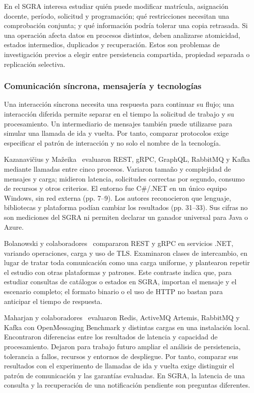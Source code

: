 En el SGRA interesa estudiar quién puede modificar matrícula, asignación docente, período, solicitud y programación; qué restricciones necesitan una comprobación conjunta; y qué información podría tolerar una copia retrasada. Si una operación afecta datos en procesos distintos, deben analizarse atomicidad, estados intermedios, duplicados y recuperación. Estos son problemas de investigación previos a elegir entre persistencia compartida, propiedad separada o replicación selectiva.

\subsubsection{Comunicación síncrona, mensajería y tecnologías}
Una interacción síncrona necesita una respuesta para continuar su flujo; una interacción diferida permite separar en el tiempo la solicitud de trabajo y su procesamiento. Un intermediario de mensajes también puede utilizarse para simular una llamada de ida y vuelta. Por tanto, comparar protocolos exige especificar el patrón de interacción y no solo el nombre de la tecnología.

Kazanavičius y Mažeika~\cite{kazanavicius2023-communication} evaluaron REST, gRPC, GraphQL, RabbitMQ y Kafka mediante llamadas entre cinco procesos. Variaron tamaño y complejidad de mensajes y carga; midieron latencia, solicitudes correctas por segundo, consumo de recursos y otros criterios. El entorno fue C\#/.NET en un único equipo Windows, sin red externa (pp. 7--9). Los autores reconocieron que lenguaje, bibliotecas y plataforma podían cambiar los resultados (pp. 31--33). Sus cifras no son mediciones del SGRA ni permiten declarar un ganador universal para Java o Azure.

Bolanowski y colaboradores~\cite{bolanowski2022-rest-grpc} compararon REST y gRPC en servicios .NET, variando operaciones, carga y uso de TLS. Examinaron clases de intercambio, en lugar de tratar toda comunicación como una carga uniforme, y plantearon repetir el estudio con otras plataformas y patrones. Este contraste indica que, para estudiar consultas de catálogos o estados en SGRA, importan el mensaje y el escenario completo; el formato binario o el uso de HTTP no bastan para anticipar el tiempo de respuesta.

Maharjan y colaboradores~\cite{maharjan2023-queues} evaluaron Redis, ActiveMQ Artemis, RabbitMQ y Kafka con OpenMessaging Benchmark y distintas cargas en una instalación local. Encontraron diferencias entre los resultados de latencia y capacidad de procesamiento. Dejaron para trabajo futuro ampliar el análisis de persistencia, tolerancia a fallos, recursos y entornos de despliegue. Por tanto, comparar sus resultados con el experimento de llamadas de ida y vuelta exige distinguir el patrón de comunicación y las garantías evaluadas. En SGRA, la latencia de una consulta y la recuperación de una notificación pendiente son preguntas diferentes.

